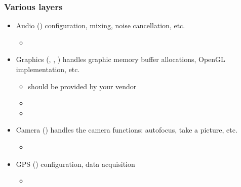 \begin{frame}
  \frametitle{Various layers}
  \begin{itemize}
  \item Audio () configuration, mixing, noise
    cancellation, etc.
    \begin{itemize}
    \item {}
    \end{itemize}
  \item Graphics (, ,
    ) handles graphic memory buffer allocations,
    OpenGL implementation, etc.
    \begin{itemize}
    \item {} should be provided by your vendor
    \item {}
    \item {}
    \end{itemize}
  \item Camera () handles the camera functions:
    autofocus, take a picture, etc.
    \begin{itemize}
    \item {}
    \end{itemize}
  \item GPS () configuration, data acquisition
    \begin{itemize}
    \item {}
    \end{itemize}
  \end{itemize}
\end{frame}

